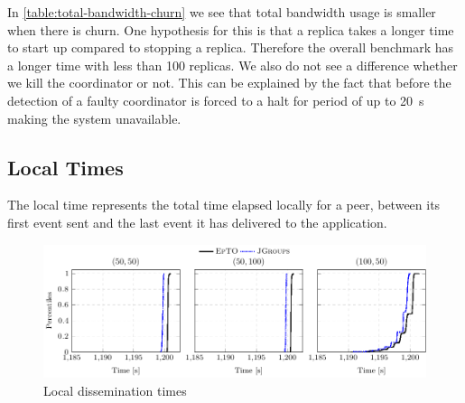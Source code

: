 \begin{table}[hpt]
	\centering
	\caption{Total \si{\giga\byte} sent/received with a synthetic churn}
	\label{table:total-bandwidth-churn} 
\end{table}
In \autoref{table:total-bandwidth-churn} we see that \jgroups total bandwidth usage is smaller when there is churn. One hypothesis for this is that a \jgroups replica takes a longer time to start up compared to stopping a replica. Therefore the overall benchmark has a longer time with less than 100 replicas. We also do not see a difference whether we kill the coordinator or not. This can be explained by the fact that before the detection of a faulty coordinator \jgroups is forced to a halt for period of up to \SI{20}{\second} making the system unavailable. 
\subsection{Local Times}
\label{sub:local-times}
The local time represents the total time elapsed locally for a peer, between its first event sent and the last event it has delivered to the application.
 \begin{figure}[hpt]
 	\centering
 	\includegraphics[width=\linewidth]{figures/local-times-nochurn.pdf}
 	\vspace{-2mm} 
 	\caption{Local dissemination times}
 	\vspace{-2mm}
 	\label{fig:local-times} 
 \end{figure}

